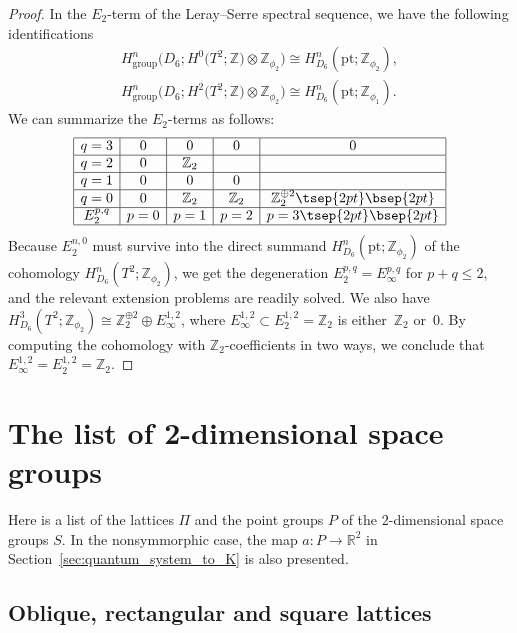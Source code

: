 \documentclass[pdftex]{sigma}
\theoremstyle{definition}
\newcommand{\R}{\mathbb{R}}
\newcommand{\Z}{\mathbb{Z}}
\newcommand{\pt}{\mathrm{pt}}
\begin{document}
\begin{proof}
In the $E_2$-term of the Leray--Serre spectral sequence, we have the following identif\/ications
\begin{gather*}
H^n_{\mathrm{group}}\big(D_6; H^0\big(T^2; \Z\big) \otimes \Z_{\phi_2}\big) \cong H^n_{D_6}(\pt; \Z_{\phi_2}), \\
H^n_{\mathrm{group}}\big(D_6; H^2\big(T^2; \Z\big) \otimes \Z_{\phi_2}\big)\cong H^n_{D_6}(\pt; \Z_{\phi_1}).
\end{gather*}
We can summarize the $E_2$-terms as follows:
$$
\begin{array}{|c|c|c|c|c|}
\hline
q = 3 & 0 & 0 & 0 & 0 \\
\hline
q = 2 & 0 & \Z_2 & & \\
\hline
q = 1 & 0 & 0 & 0 & \\
\hline
q = 0 & 0 & \Z_2 & \Z_2 & \Z_2^{\oplus 2} \tsep{2pt}\bsep{2pt} \\
\hline
E_2^{p, q} & p = 0 & p = 1 & p = 2 & p = 3 \tsep{2pt}\bsep{2pt}\\
\hline
\end{array}
$$
Because $E_2^{n, 0}$ must survive into the direct summand $H^n_{D_6}(\pt; \Z_{\phi_2})$ of the cohomology \linebreak $H^n_{D_6}(T^2; \Z_{\phi_2})$, we get the degeneration $E_2^{p, q} = E_\infty^{p, q}$ for $p + q \le 2$, and the relevant extension problems are readily solved. We also have $H^3_{D_6}(T^2; \Z_{\phi_2}) \cong \Z_2^{\oplus 2} \oplus E_\infty^{1, 2}$, where $E_\infty^{1, 2} \subset E_2^{1, 2} = \Z_2$ is either~$\Z_2$ or~$0$. By computing the cohomology with $\Z_2$-coef\/f\/icients in two ways, we conclude that $E_\infty^{1, 2} = E_2^{1, 2} = \Z_2$.
\end{proof}

\appendix

\section{The list of 2-dimensional space groups}\label{sec:appendix:wallpapers}

Here is a list of the lattices $\Pi$ and the point groups $P$ of the $2$-dimensional space groups $S$. In the nonsymmorphic case, the map $a\colon P \to \R^2$ in Section~\ref{sec:quantum_system_to_K} is also presented.

\subsection{Oblique, rectangular and square lattices}
\end{document}
